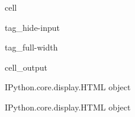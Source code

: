 \documentclass[letterpaper,10pt,english]{jupyterBook}
\begin{document}
\begin{sphinxuseclass}{cell}
\begin{sphinxuseclass}{tag_hide-input}
\begin{sphinxuseclass}{tag_full-width}
\begin{sphinxVerbatimOutput}
\begin{sphinxuseclass}{cell_output}
\begin{sphinxVerbatim}[commandchars=\\\{\}]
\PYGZlt{}IPython.core.display.HTML object\PYGZgt{}
\end{sphinxVerbatim}

\begin{sphinxVerbatim}[commandchars=\\\{\}]
\PYGZlt{}IPython.core.display.HTML object\PYGZgt{}
\end{sphinxVerbatim}

\end{sphinxuseclass}\end{sphinxVerbatimOutput}

\end{sphinxuseclass}
\end{sphinxuseclass}
\end{sphinxuseclass}
\end{document}
